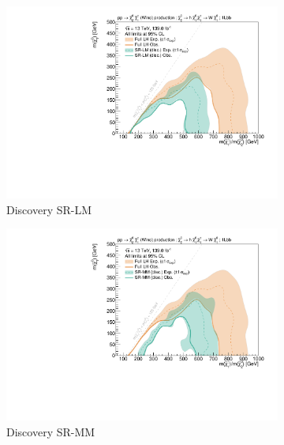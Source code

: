 \begin{figure}
	\centering
	\begin{subfigure}[b]{0.5\textwidth}
		\centering\includegraphics[width=\textwidth]{exclusion_1Lbb_SRLM_noLabel}
		\caption{Discovery SR-LM\label{fig:single_bin_SRLM}}
	\end{subfigure}\hfill
	\begin{subfigure}[b]{0.5\textwidth}
		\centering\includegraphics[width=\textwidth]{exclusion_1Lbb_SRMM_noLabel}
		\caption{Discovery SR-MM\label{fig:single_bin_SRMM}}
	\end{subfigure}\hfill
	\begin{subfigure}[b]{0.5\textwidth}

\end{subfigure}
\end{figure}
